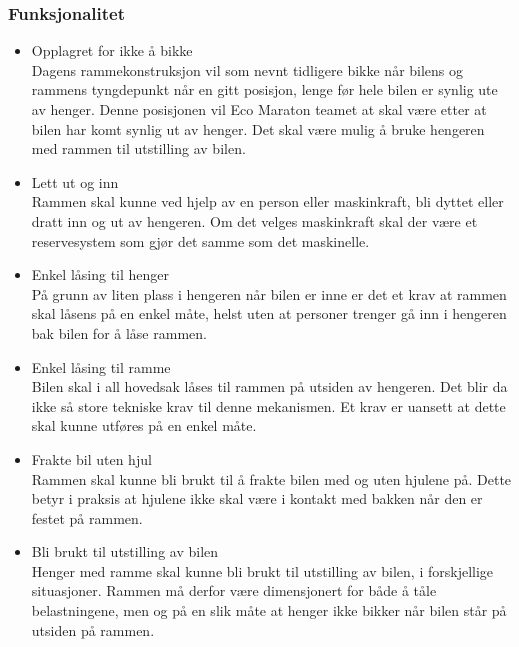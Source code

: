 \subsubsection{Funksjonalitet}
\begin{itemize}
\item Opplagret for ikke å bikke \\
Dagens rammekonstruksjon vil som nevnt tidligere bikke når bilens og rammens tyngdepunkt når en gitt posisjon, lenge før hele bilen er synlig ute av henger. Denne posisjonen vil Eco Maraton teamet at skal være etter at bilen har komt synlig ut av henger. Det skal være mulig å bruke hengeren med rammen til utstilling av bilen. 
\item Lett ut og inn \\
Rammen skal kunne ved hjelp av en person eller maskinkraft, bli dyttet eller dratt inn og ut av hengeren. Om det velges maskinkraft skal der være et reservesystem som gjør det samme som det maskinelle. 
\item Enkel låsing til henger \\
På grunn av liten plass i hengeren når bilen er inne er det et krav at rammen skal låsens på en enkel måte, helst uten at personer trenger gå inn i hengeren bak bilen for å låse rammen. 
\item Enkel låsing til ramme \\
Bilen skal i all hovedsak låses til rammen på utsiden av hengeren. Det blir da ikke så store tekniske krav til denne mekanismen. Et krav er uansett at dette skal kunne utføres på en enkel måte.
\item Frakte bil uten hjul \\
Rammen skal kunne bli brukt til å frakte bilen med og uten hjulene på. Dette betyr i praksis at hjulene ikke skal være i kontakt med bakken når den er festet på rammen. 
\item Bli brukt til utstilling av bilen \\
Henger med ramme skal kunne bli brukt til utstilling av bilen, i forskjellige situasjoner. Rammen må derfor være dimensjonert for både å tåle belastningene, men og på en slik måte at henger ikke bikker når bilen står på utsiden på rammen.
\end{itemize}
